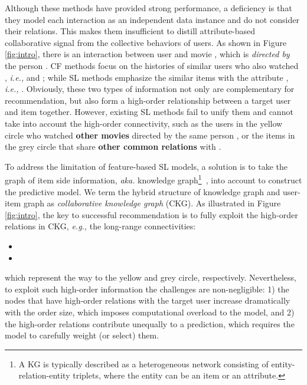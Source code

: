 \documentclass[sigconf]{acmart}
\newcommand{\ie}{\emph{i.e., }}
\newcommand{\eg}{\emph{e.g., }}
\newcommand{\aka}{\emph{aka. }}
\theoremstyle{definition}
\begin{document}
Although these methods have provided strong performance, a deficiency is that they model each interaction as an independent data instance and do not consider their relations. 
This makes them insufficient to distill attribute-based collaborative signal from the collective behaviors of users.
As shown in Figure \ref{fig:intro}, there is an interaction between user  and movie , which is \textit{directed by} the person . CF methods focus on the histories of similar users who also watched , \ie  and ; while SL methods emphasize the similar items with the attribute , \ie . Obviously, these two types of information not only are complementary for recommendation, but also form a high-order relationship between a target user and item together. However, existing SL methods fail to unify them and cannot take into account the high-order connectivity, such as the users in the yellow circle who watched \textbf{other movies} directed by the same person , or the items in the grey circle that share \textbf{other common relations} with .


To address the limitation of feature-based SL models, a solution is to take the graph of item side information, \aka knowledge graph\footnote{A KG is typically described as a heterogeneous network consisting of entity-relation-entity triplets, where the entity can be an item or an attribute.}~\cite{cao2018joint,cao2018neural}, into account to construct the predictive model. We term the hybrid structure of knowledge graph and user-item graph as \textit{collaborative knowledge graph} (CKG).
As illustrated in Figure \ref{fig:intro}, the key to successful recommendation is to fully exploit the high-order relations in CKG, \eg the long-range connectivities:
\begin{itemize}[leftmargin=*]
    \item 
    \item 
\end{itemize}
which represent the way to the yellow and grey circle, respectively.
Nevertheless, to exploit such high-order information the challenges are non-negligible: 1) the nodes that have high-order relations with the target user increase dramatically with the order size, which imposes computational overload to the model, and 2) the high-order relations contribute unequally to a prediction, which requires the model to carefully weight (or select) them. 
\end{document}

